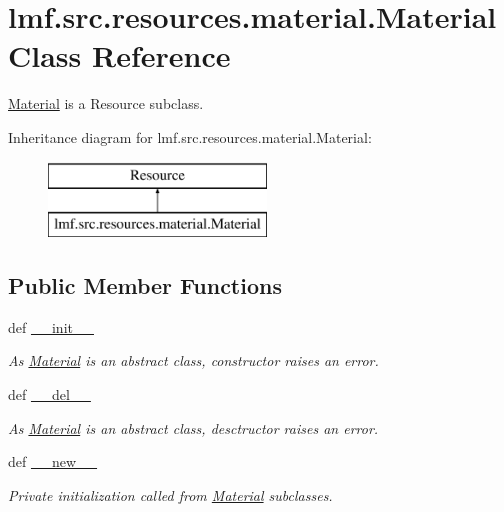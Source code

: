 \hypertarget{classlmf_1_1src_1_1resources_1_1material_1_1_material}{\section{lmf.\+src.\+resources.\+material.\+Material Class Reference}
\label{classlmf_1_1src_1_1resources_1_1material_1_1_material}
}


\hyperlink{classlmf_1_1src_1_1resources_1_1material_1_1_material}{Material} is a Resource subclass.  


Inheritance diagram for lmf.\+src.\+resources.\+material.\+Material\+:\begin{figure}[H]
\begin{center}
\leavevmode
\includegraphics[height=2.000000cm]{classlmf_1_1src_1_1resources_1_1material_1_1_material}
\end{center}
\end{figure}
\subsection*{Public Member Functions}
\begin{DoxyCompactItemize}
\item 
def \hyperlink{classlmf_1_1src_1_1resources_1_1material_1_1_material_af93c831604873840e4b8f55949c28908}{\+\_\+\+\_\+init\+\_\+\+\_\+}
\begin{DoxyCompactList}\small\item\em As \hyperlink{classlmf_1_1src_1_1resources_1_1material_1_1_material}{Material} is an abstract class, constructor raises an error. \end{DoxyCompactList}\item 
def \hyperlink{classlmf_1_1src_1_1resources_1_1material_1_1_material_aeb5aef3dc67be13df017c088a396d94a}{\+\_\+\+\_\+del\+\_\+\+\_\+}
\begin{DoxyCompactList}\small\item\em As \hyperlink{classlmf_1_1src_1_1resources_1_1material_1_1_material}{Material} is an abstract class, desctructor raises an error. \end{DoxyCompactList}\item 
def \hyperlink{classlmf_1_1src_1_1resources_1_1material_1_1_material_a62fe17d9d1ceaf5efd1c2536f3957b32}{\+\_\+\+\_\+new\+\_\+\+\_\+}
\begin{DoxyCompactList}\small\item\em Private initialization called from \hyperlink{classlmf_1_1src_1_1resources_1_1material_1_1_material}{Material} subclasses. \end{DoxyCompactList}\end{DoxyCompactItemize}
